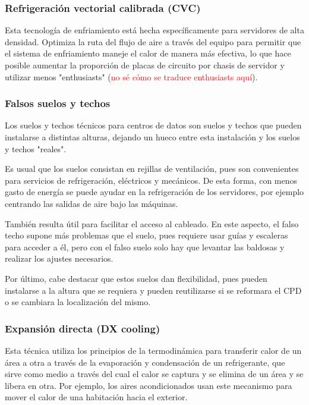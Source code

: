\subsubsection{Refrigeración vectorial calibrada (CVC)}

Esta tecnología de enfriamiento está hecha específicamente para servidores de alta densidad. Optimiza la ruta del flujo de aire a través del equipo para permitir que el sistema de enfriamiento maneje el calor de manera más efectiva, lo que hace posible aumentar la proporción de placas de circuito por chasis de servidor y utilizar menos "enthusiasts" (\textcolor{red}{no sé cómo se traduce enthusiasts aquí}).

\subsubsection{Falsos suelos y techos}

Los suelos y techos técnicos para centros de datos son suelos y techos que pueden instalarse a distintas alturas, dejando un hueco entre esta instalación y los suelos y techos "reales".

Es usual que los suelos consistan en rejillas de ventilación, pues son convenientes para servicios de refrigeración, eléctricos y mecánicos. De esta forma, con menos gasto de energía se puede ayudar en la refrigeración de los servidores, por ejemplo centrando las salidas de aire bajo las máquinas.

También resulta útil para facilitar el acceso al cableado. En este aspecto, el falso techo supone más problemas que el suelo, pues requiere usar guías y escaleras para acceder a él, pero con el falso suelo solo hay que levantar las baldosas y realizar los ajustes necesarios.

Por último, cabe destacar que estos suelos dan flexibilidad, pues pueden instalarse a la altura que se requiera y pueden reutilizarse si se reformara el CPD o se cambiara la localización del mismo.

\subsubsection{Expansión directa (DX cooling)}

Esta técnica utiliza los principios de la termodinámica para transferir calor de un área a otra a través de la evaporación y condensación de un refrigerante, que sirve como medio a través del cual el calor se captura y se elimina de un área y se libera en otra. Por ejemplo, los aires acondicionados usan este mecanismo para mover el calor de una habitación hacia el exterior.

